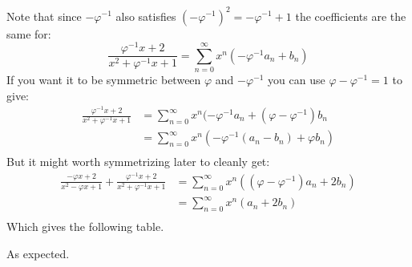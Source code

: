 Note that since $-\varphi^{-1}$ also satisfies $(-\varphi^{-1})^2 = -\varphi^{-1}+1$ the coefficients are the same for:
\[\frac{\varphi^{-1} x+2}{x^2+\varphi^{-1} x+1} = \sum_{n=0}^\infty x^n(-\varphi^{-1} a_n+b_n)\]
If you want it to be symmetric between $\varphi$ and $-\varphi^{-1}$ you can use $\varphi-\varphi^{-1}=1$ to give:
\[\begin{aligned}
	\frac{\varphi^{-1} x+2}{x^2+\varphi^{-1} x+1} &= \sum_{n=0}^\infty x^n(-\varphi^{-1} a_n+(\varphi-\varphi^{-1})b_n\\
	&= \sum_{n=0}^\infty x^n(-\varphi^{-1} (a_n-b_n)+\varphi b_n)\\
\end{aligned}\]
But it might worth symmetrizing later to cleanly get:
\[\begin{aligned}
	\frac{-\varphi x+2}{x^2-\varphi x+1} + \frac{\varphi^{-1} x+2}{x^2+\varphi^{-1} x+1} &=\sum_{n=0}^\infty x^n((\varphi-\varphi^{-1}) a_n+2b_n) \\
	&=\sum_{n=0}^\infty x^n( a_n+2b_n) \\
\end{aligned}\]
Which gives the following table.
\begin{center}
\end{center}
As expected.
\\

